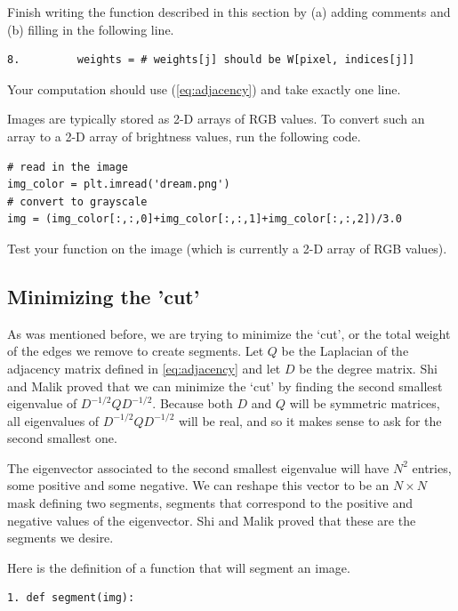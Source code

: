 \begin{problem}
Finish writing the function  described in this section by (a) adding comments and (b) filling in the following line.
\begin{lstlisting}
8.         weights = # weights[j] should be W[pixel, indices[j]]
\end{lstlisting}
Your computation should use (\ref{eq:adjacency}) and take exactly one line.

Images are typically stored as 2-D arrays of RGB values. To convert such an array to a 2-D array of brightness values, run the following code.
\begin{lstlisting}
# read in the image
img_color = plt.imread('dream.png')
# convert to grayscale
img = (img_color[:,:,0]+img_color[:,:,1]+img_color[:,:,2])/3.0
\end{lstlisting}
Test your function on the image  (which is currently a 2-D array of RGB values).


\label{prob:adjacency_dream}
\end{problem}

\subsection*{Minimizing the 'cut'}

As was mentioned before, we are trying to minimize the `cut', or the total weight of the edges we remove to create segments. 
Let $Q$ be the Laplacian of the adjacency matrix defined in \ref{eq:adjacency} and let $D$ be the degree matrix.
Shi and Malik proved that we can minimize the `cut' by finding the second smallest eigenvalue of $D^{-1/2}QD^{-1/2}$.
Because both $D$ and $Q$ will be symmetric matrices, all eigenvalues of $D^{-1/2}QD^{-1/2}$ will be real, and so it makes sense to ask for the second smallest one.

The eigenvector associated to the second smallest eigenvalue will have $N^2$ entries, some positive and some negative. 
We can reshape this vector to be an $N \times N$ mask defining two segments, segments that correspond to the positive and negative values of the eigenvector.
Shi and Malik proved that these are the segments we desire. 

Here is the definition of a function that will segment an image.
\begin{lstlisting}
1. def segment(img):
\end{lstlisting}

